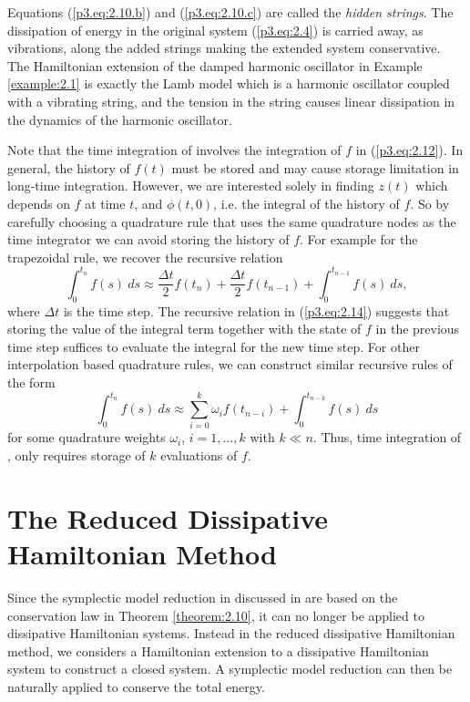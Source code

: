 Equations (\ref{p3.eq:2.10.b}) and (\ref{p3.eq:2.10.c}) are called the \emph{hidden strings}. The dissipation of energy in the original system (\ref{p3.eq:2.4}) is carried away, as vibrations, along the added strings making the extended system conservative. The Hamiltonian extension of the damped harmonic oscillator in Example \ref{example:2.1} is exactly the Lamb model \cite{lamb:1900} which is a harmonic oscillator coupled with a vibrating string, and the tension in the string causes linear dissipation in the dynamics of the harmonic oscillator.

Note that the time integration of  involves the integration of $f$ in (\ref{p3.eq:2.12}). In general, the history of $f(t)$ must be stored and may cause storage limitation in long-time integration. However, we are interested solely in finding $z(t)$ which depends on $f$ at time $t$, and $\phi(t,0)$, i.e. the integral of the history of $f$. So by carefully choosing a quadrature rule that uses the same quadrature nodes as the time integrator we can avoid storing the history of $f$. For example for the trapezoidal rule, we recover the recursive relation
\begin{equation} \label{p3.eq:2.14}
	\int_{0}^{t_n} f(s) \ ds \approx \frac{\Delta t}{2} f(t_n) + \frac{\Delta t}{2} f(t_{n-1}) + \int_{0}^{t_{n-1}} f(s) \ ds,
\end{equation}
where $\Delta t$ is the time step. The recursive relation in (\ref{p3.eq:2.14}) suggests that storing the value of the integral term together with the state of $f$ in the previous time step suffices to evaluate the integral for the new time step. For other interpolation based quadrature rules, we can construct similar recursive rules of the form
\begin{equation}
	\int_{0}^{t_n} f(s) \ ds \approx \sum_{i=0}^{k} \omega_i f(t_{n-i})  + \int_{0}^{t_{n-k}} f(s) \ ds
\end{equation}
for some quadrature weights $\omega_i$, $i=1,\dots,k$ with $k\ll n$. Thus, time integration of , only requires storage of $k$ evaluations of $f$.


\section{The Reduced Dissipative Hamiltonian Method} \label{p3.sec:3}

Since the symplectic model reduction in discussed in  are based on the conservation law in Theorem \ref{theorem:2.10}, it can no longer be applied to dissipative Hamiltonian systems. Instead in the reduced dissipative Hamiltonian method, we considers a Hamiltonian extension to a dissipative Hamiltonian system to construct a closed system. A symplectic model reduction can then be naturally applied to conserve the total energy.

